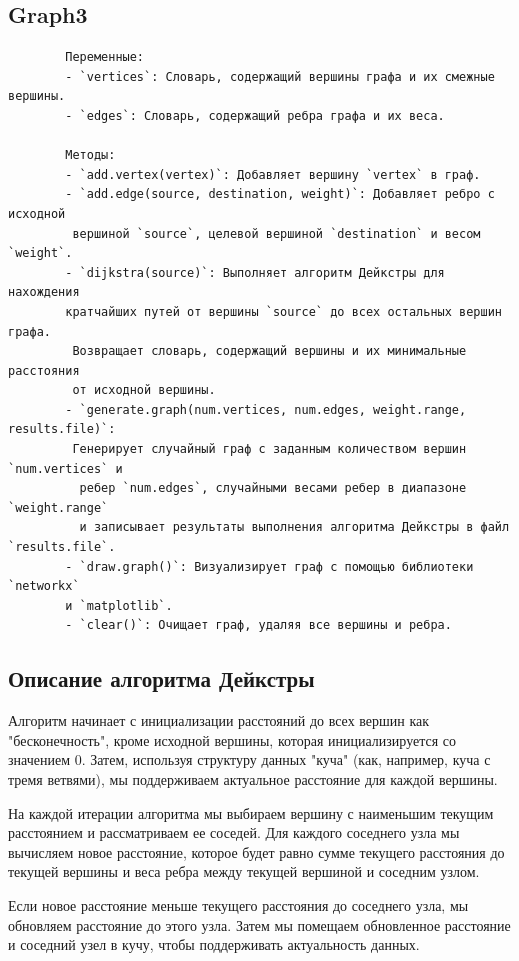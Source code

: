\documentclass[a4paper, 12pt]{article}
\theoremstyle{definition}
\begin{document}
	\subsection{Graph3}
	\begin{verbatim}
		Переменные:
		- `vertices`: Словарь, содержащий вершины графа и их смежные вершины.
		- `edges`: Словарь, содержащий ребра графа и их веса.
		
		Методы:
		- `add.vertex(vertex)`: Добавляет вершину `vertex` в граф.
		- `add.edge(source, destination, weight)`: Добавляет ребро с исходной
		 вершиной `source`, целевой вершиной `destination` и весом `weight`.
		- `dijkstra(source)`: Выполняет алгоритм Дейкстры для нахождения 
		кратчайших путей от вершины `source` до всех остальных вершин графа.
		 Возвращает словарь, содержащий вершины и их минимальные расстояния 
		 от исходной вершины.
		- `generate.graph(num.vertices, num.edges, weight.range, results.file)`:
		 Генерирует случайный граф с заданным количеством вершин `num.vertices` и
		  ребер `num.edges`, случайными весами ребер в диапазоне `weight.range` 
		  и записывает результаты выполнения алгоритма Дейкстры в файл `results.file`.
		- `draw.graph()`: Визуализирует граф с помощью библиотеки `networkx`
		и `matplotlib`.
		- `clear()`: Очищает граф, удаляя все вершины и ребра.
	\end{verbatim}
	\subsection{Описание алгоритма Дейкстры}
	
		Алгоритм начинает с инициализации расстояний до всех вершин как "бесконечность", кроме исходной вершины, которая инициализируется со значением 0. Затем, используя структуру данных "куча" (как, например, куча с тремя ветвями), мы поддерживаем актуальное расстояние для каждой вершины. \newline
		
		На каждой итерации алгоритма мы выбираем вершину с наименьшим текущим расстоянием и рассматриваем ее соседей. Для каждого соседнего узла мы вычисляем новое расстояние, которое будет равно сумме текущего расстояния до текущей вершины и веса ребра между текущей вершиной и соседним узлом.\newline
		
		Если новое расстояние меньше текущего расстояния до соседнего узла, мы обновляем расстояние до этого узла. Затем мы помещаем обновленное расстояние и соседний узел в кучу, чтобы поддерживать актуальность данных.\newline
		
\end{document}
